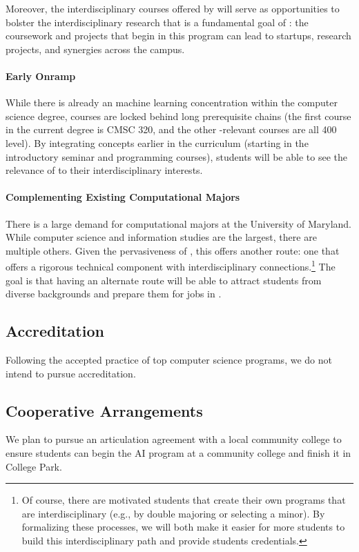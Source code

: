 Moreover, the interdisciplinary courses offered by \short{} will serve as opportunities to bolster the interdisciplinary research that is a fundamental goal of \aim{}: the coursework and projects that begin in this program can lead to startups, research projects, and synergies across the campus.

\paragraph{Early Onramp}

While there is already an machine learning  concentration within the computer science degree,  courses are locked behind long prerequisite chains (the first course in the current  degree is CMSC 320, and the other -relevant courses are all 400 level).  
%
By integrating  concepts earlier in the curriculum (starting in the introductory seminar and programming courses), students will be able to see the relevance of  to their interdisciplinary interests.

\paragraph{Complementing Existing Computational Majors}

There is a large demand for computational majors at the University of Maryland.  
%
While computer science and information studies are the largest, there are multiple others.
%
Given the pervasiveness of , this offers another route: one that offers a rigorous technical component with interdisciplinary connections.\footnote{Of course, there are motivated students that create their own programs that are interdisciplinary (e.g., by double majoring or selecting a minor).  By formalizing these processes, we will both make it easier for more students to build this interdisciplinary path and provide students credentials.}
%
The goal is that having an alternate route will be able to attract students from diverse backgrounds and prepare them for jobs in . 

\subsection{Accreditation}

Following the accepted practice of top computer science programs, we do not intend to pursue accreditation.

\subsection{Cooperative Arrangements}

We plan to pursue an articulation agreement with a local community college to ensure students can begin the AI program at a community college and finish it in College Park.